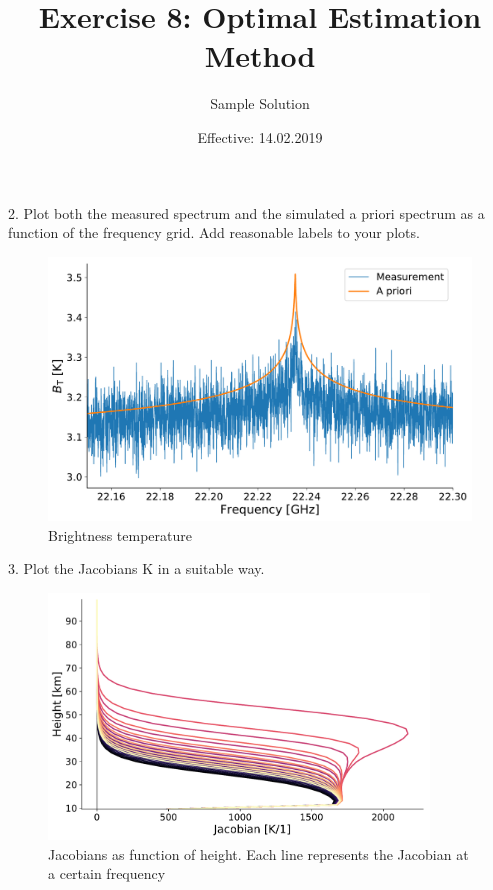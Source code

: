 \documentclass[paper=a4, fontsize=11pt]{scrartcl}
\title{Exercise 8: Optimal Estimation Method}
\author{Sample Solution}
\date{Effective: 14.02.2019}
\begin{document}
\maketitle

2. Plot both the measured spectrum and the simulated a priori spectrum as a
function of the frequency grid. Add reasonable labels to your plots.

\begin{figure}[ht]
  \centering
  \includegraphics[width=\textwidth]{plots/bt_spectrum.pdf}
  \caption{Brightness temperature \label{fig:bt_spectrum}}
\end{figure}

\newpage

3. Plot the Jacobians K in a suitable way.

\begin{figure}[h!]
  \centering
  \includegraphics[width=0.9\textwidth]{plots/jacobians.pdf}
  \caption{Jacobians as function of height. Each line represents the Jacobian
    at a certain frequency \label{fig:jacobians}}
\end{figure}
\end{document}
